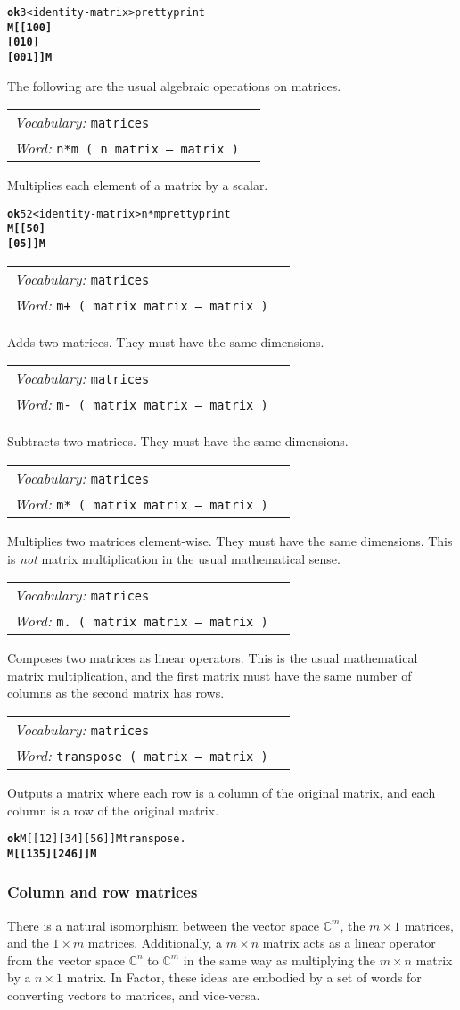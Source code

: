\documentclass{book}
\newcommand{\vocabulary}[1]{\emph{Vocabulary:} \texttt{#1}&\\}
\newcommand{\ordinaryword}[2]{\index{\texttt{#1}}\emph{Word:} \texttt{#2}&\\}
\newcommand{\wordtable}[1]{


\begin{tabularx}{12cm}{lX}
\hline
#1
\hline
\end{tabularx}

}
\begin{document}
\begin{alltt}
\textbf{ok} 3 <identity-matrix> prettyprint
\textbf{M[ [ 1 0 0 ]
   [ 0 1 0 ]
   [ 0 0 1 ] ]M}
\end{alltt}

The following are the usual algebraic operations on matrices.

\wordtable{
\vocabulary{matrices}
\ordinaryword{n*m}{n*m ( n matrix -- matrix )}
}
Multiplies each element of a matrix by a scalar.
\begin{alltt}
\textbf{ok} 5 2 <identity-matrix> n*m prettyprint
\textbf{M[ [ 5 0 ]
   [ 0 5 ] ]M}
\end{alltt}

\wordtable{
\vocabulary{matrices}
\ordinaryword{m+}{m+~( matrix matrix -- matrix )}
}
Adds two matrices. They must have the same dimensions.

\wordtable{
\vocabulary{matrices}
\ordinaryword{m-}{m-~( matrix matrix -- matrix )}
}
Subtracts two matrices. They must have the same dimensions.

\wordtable{
\vocabulary{matrices}
\ordinaryword{m*}{m*~( matrix matrix -- matrix )}
}
Multiplies two matrices element-wise. They must have the same dimensions. This is \emph{not} matrix multiplication in the usual mathematical sense.

\wordtable{
\vocabulary{matrices}
\ordinaryword{m.}{m.~( matrix matrix -- matrix )}
}
Composes two matrices as linear operators. This is the usual mathematical matrix multiplication, and the first matrix must have the same number of columns as the second matrix has rows.

\wordtable{
\vocabulary{matrices}
\ordinaryword{transpose}{transpose~( matrix -- matrix )}
}
Outputs a matrix where each row is a column of the original matrix, and each column is a row of the original matrix.
\begin{alltt}
\textbf{ok} M[ [ 1 2 ] [ 3 4 ] [ 5 6 ] ]M transpose .
\textbf{M[ [ 1 3 5 ] [ 2 4 6 ] ]M}
\end{alltt}

\subsubsection{Column and row matrices}

There is a natural isomorphism between the vector space $\mathbb{C}^m$, the $m\times 1$ matrices, and the $1 \times m$ matrices. Additionally, a $m\times n$ matrix acts as a linear operator from the vector space $\mathbb{C}^n$ to $\mathbb{C}^m$ in the same way as multiplying the $m\times n$ matrix by a $n \times 1$ matrix. In Factor, these ideas are embodied by a set of words for converting vectors to matrices, and vice-versa.
\end{document}
